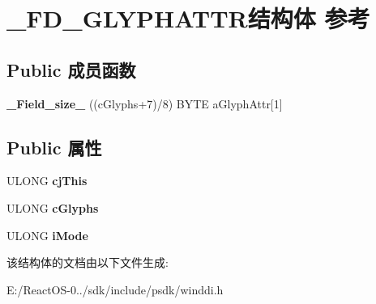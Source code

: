 \hypertarget{struct___f_d___g_l_y_p_h_a_t_t_r}{}\section{\+\_\+\+F\+D\+\_\+\+G\+L\+Y\+P\+H\+A\+T\+T\+R结构体 参考}
\label{struct___f_d___g_l_y_p_h_a_t_t_r}
\subsection*{Public 成员函数}
\begin{DoxyCompactItemize}
\item 
\mbox{\label{struct___f_d___g_l_y_p_h_a_t_t_r_a6057ecb018986e6f292835c0b01924b3}} 
{\bfseries \+\_\+\+Field\+\_\+size\+\_\+} ((c\+Glyphs+7)/8) B\+Y\+TE a\+Glyph\+Attr\mbox{[}1\mbox{]}
\end{DoxyCompactItemize}
\subsection*{Public 属性}
\begin{DoxyCompactItemize}
\item 
\mbox{\label{struct___f_d___g_l_y_p_h_a_t_t_r_ac01252c4b44cedf5686e8924e4ce8dfa}} 
U\+L\+O\+NG {\bfseries cj\+This}
\item 
\mbox{\label{struct___f_d___g_l_y_p_h_a_t_t_r_a740a82999f9374b7741257b8d85bb43b}} 
U\+L\+O\+NG {\bfseries c\+Glyphs}
\item 
\mbox{\label{struct___f_d___g_l_y_p_h_a_t_t_r_a3c5fb0d0796c96a3779a25bf4bb60937}} 
U\+L\+O\+NG {\bfseries i\+Mode}
\end{DoxyCompactItemize}


该结构体的文档由以下文件生成\+:\begin{DoxyCompactItemize}
\item 
E\+:/\+React\+O\+S-\/0../sdk/include/psdk/winddi.\+h\end{DoxyCompactItemize}
